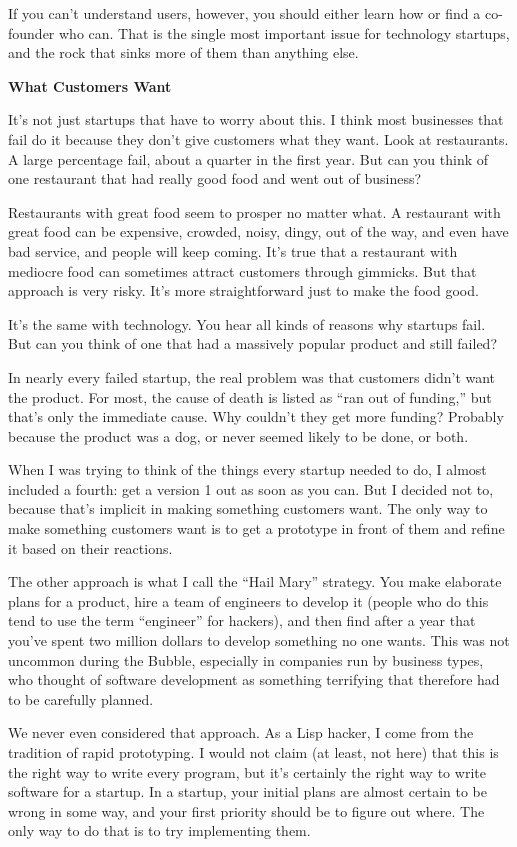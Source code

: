 \documentclass[12pt]{book}
\begin{document}
If you can't understand users, however, you should either learn how or
find a co-founder who can. That is the single most important issue for
technology startups, and the rock that sinks more of them than anything
else.

\textbf{What Customers Want}

It's not just startups that have to worry about this. I think most
businesses that fail do it because they don't give customers what they
want. Look at restaurants. A large percentage fail, about a quarter in
the first year. But can you think of one restaurant that had really good
food and went out of business?

Restaurants with great food seem to prosper no matter what. A restaurant
with great food can be expensive, crowded, noisy, dingy, out of the way,
and even have bad service, and people will keep coming. It's true that a
restaurant with mediocre food can sometimes attract customers through
gimmicks. But that approach is very risky. It's more straightforward
just to make the food good.

It's the same with technology. You hear all kinds of reasons why
startups fail. But can you think of one that had a massively popular
product and still failed?

In nearly every failed startup, the real problem was that customers
didn't want the product. For most, the cause of death is listed as ``ran
out of funding,'' but that's only the immediate cause. Why couldn't they
get more funding? Probably because the product was a dog, or never
seemed likely to be done, or both.

When I was trying to think of the things every startup needed to do, I
almost included a fourth: get a version 1 out as soon as you can. But I
decided not to, because that's implicit in making something customers
want. The only way to make something customers want is to get a
prototype in front of them and refine it based on their reactions.

The other approach is what I call the ``Hail Mary'' strategy. You make
elaborate plans for a product, hire a team of engineers to develop it
(people who do this tend to use the term ``engineer'' for hackers), and
then find after a year that you've spent two million dollars to develop
something no one wants. This was not uncommon during the Bubble,
especially in companies run by business types, who thought of software
development as something terrifying that therefore had to be carefully
planned.

We never even considered that approach. As a Lisp hacker, I come from
the tradition of rapid prototyping. I would not claim (at least, not
here) that this is the right way to write every program, but it's
certainly the right way to write software for a startup. In a startup,
your initial plans are almost certain to be wrong in some way, and your
first priority should be to figure out where. The only way to do that is
to try implementing them.
\end{document}
